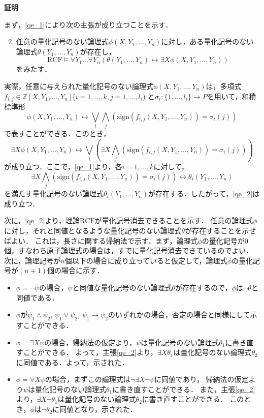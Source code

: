 \documentclass[uplatex, dvipdfmx]{jsarticle}
\makeatletter
\renewenvironment{proof}[1][\proofname]{\par
  \pushQED{\qed}%
  \normalfont \topsep6\p@\@plus6\p@\relax
  \trivlist
  \item\relax
  {\bfseries
  #1\@addpunct{.}}\hspace\labelsep\ignorespaces
}{%
  \popQED\endtrivlist\@endpefalse
}
\newcommand{\Z}{\mathbb{Z}}
\newcommand{\RCF}{\mathrm{RCF}}
\newcommand{\sign}{\mathrm{sign}}
\newcommand{\map}[3]{{#1}:{#2}\rightarrow{#3}}
\theoremstyle{definition}
\renewcommand{\proofname}{\textbf{証明}}
\makeatother
\begin{document}
\begin{proof}
     まず，\ref{qe_1}により次の主張が成り立つことを示す．
     \begin{enumerate}
          \setcounter{enumi}{1}
          \item \label{qe_2}
          任意の量化記号のない論理式$\phi(X, Y_1, \dots, Y_n)$に対し，ある量化記号のない論理式$\theta(Y_1, \dots, Y_n)$が存在し，
          \[
               \RCF \models \forall Y_1 \dots \forall Y_n(\theta(Y_1, \dots, Y_n) \leftrightarrow \exists X \phi(X, Y_1, \dots, Y_n))
          \]
          をみたす．
     \end{enumerate}
     実際，任意に与えられた量化記号のない論理式$\phi(X, Y_1, \dots, Y_n)$は，多項式$f_{i,j} \in \Z[X, Y_1, \dots, Y_n]$($i=1, \dots, k, j=1, \dots, l_i$)
     と$\map{\sigma_i}{\{1, \dots, l_i\}}{P}$を用いて，和積標準形
     \[
          \phi(X, Y_1, \dots, Y_n) \leftrightarrow \bigvee_i \bigwedge_j (\sign(f_{i,j}(X, Y_1, \dots, Y_n)) = \sigma_i(j))
     \]
     で表すことができる．このとき，
     \[
          \exists X \phi(X, Y_1, \dots, Y_n) \leftrightarrow \bigvee_i (\exists X \bigwedge_j (\sign(f_{i,j}(X, Y_1, \dots, Y_n)) = \sigma_i(j)))
     \]
     が成り立つ．ここで，\ref{qe_1}より，各$i=1, \dots, k$に対して，
     \[
          \exists X \bigwedge_j (\sign(f_{i,j}(X, Y_1, \dots, Y_n)) = \sigma_i(j)) \leftrightarrow \theta_i(Y_1, \dots, Y_n)
     \]
     を満たす量化記号のない論理式$\theta_i(Y_1, \dots, Y_n)$が存在する．したがって，\ref{qe_2}は成り立つ．

     次に，\ref{qe_2}より，理論$\RCF$が量化記号消去できることを示す．
     任意の論理式$\phi$に対し，それと同値となるような量化記号のない論理式$\theta$が存在することを示せばよい．
     これは，長さに関する帰納法で示す．まず，論理式$\phi$の量化記号が0個，すなわち原子論理式の場合は，すでに量化記号消去できているのでよい．
     次に，論理記号が$n$個以下の場合に成り立っていると仮定して，論理式$\phi$の量化記号が$(n+1)$個の場合に示す．

     \begin{itemize}
          \item $\phi = \lnot \psi$の場合，$\psi$と同値な量化記号のない論理式$\theta$が存在するので，$\phi$は$\lnot \theta$と同値である．
          \item $\phi$が$\psi_1 \land \psi_2$, $\psi_1 \lor \psi_2$, $\psi_1 \rightarrow \psi_2$のいずれかの場合，否定の場合と同様にして示すことができる．
          \item $\phi = \exists X \psi$の場合，帰納法の仮定より，$\psi$は量化記号のない論理式$\theta_1$に書き直すことができる．
          よって，主張\ref{qe_2}より，$\exists X \theta_1$は量化記号のない論理式$\theta_2$に同値である．よって，示された．
          \item $\phi = \forall X \psi$の場合，まずこの論理式は$\lnot \exists X \lnot \psi$に同値であり，
          帰納法の仮定より$\psi$は量化記号のない論理式$\theta_1$に書き直すことができる．
          また，主張\ref{qe_2}より，$\exists X \lnot \theta_1$は量化記号のない論理式$\theta_2$に書き直すことができる．
          このとき，$\phi$は$\lnot \theta_2$に同値となり，示された．
     \end{itemize}     


\end{proof}
\end{document}
